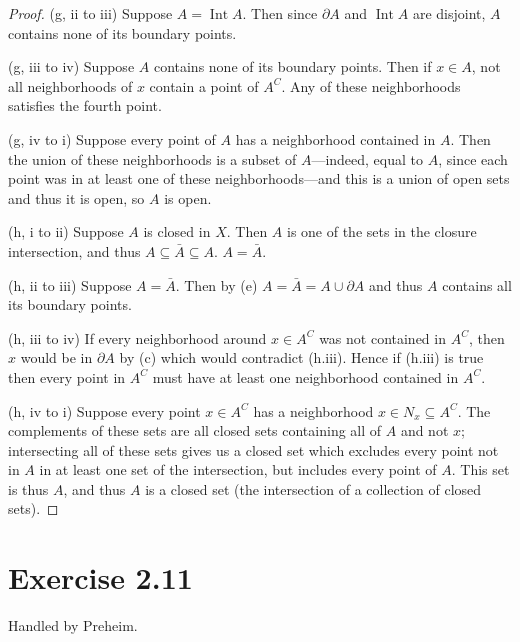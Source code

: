 \documentclass{article}
\newtheorem{theorem}[subsection]{Theorem}
\theoremstyle{definition}
\begin{document}
\begin{proof}
(g, ii to iii)
Suppose $A = \operatorname{Int} A$. Then since $\partial A$ and $\operatorname{Int} A$
are disjoint, $A$ contains none of its boundary points.

(g, iii to iv)
Suppose $A$ contains none of its boundary points. Then if $x \in A$, not all neighborhoods
of $x$ contain a point of $A^C$. Any of these neighborhoods satisfies the fourth point.

(g, iv to i)
Suppose every point of $A$ has a neighborhood contained in $A$. Then the union of these
neighborhoods is a subset of $A$---indeed, equal to $A$, since each point was in at least
one of these neighborhoods---and this is a union of open sets and thus it is open, so 
$A$ is open.

(h, i to ii)
Suppose $A$ is closed in $X$. Then $A$ is one of the sets in the closure intersection,
and thus $A \subseteq \bar{A} \subseteq A$. $A=\bar{A}$.

(h, ii to iii)
Suppose $A = \bar{A}$. Then by (e) $A = \bar{A} = A \cup \partial A$ and thus $A$
contains all its boundary points.

(h, iii to iv) 
If every neighborhood around $x \in A^C$ was not contained in $A^C$, then 
$x$ would be in $\partial A$ by (c) which would contradict (h.iii). Hence
if (h.iii) is true then every point in $A^C$ must have at least one neighborhood
contained in $A^C$.

(h, iv to i)
Suppose every point $x \in A^C$ has a neighborhood $x \in N_x \subseteq A^C$. The 
complements of these sets are all closed sets containing all of $A$ and not $x$; 
intersecting all of these sets gives us a closed set which excludes every point
not in $A$ in at least one set of the intersection, but includes every point of
$A$. This set is thus $A$, and thus $A$ is a closed set (the intersection of 
a collection of closed sets).
\end{proof}

\section{Exercise 2.11}
Handled by Preheim.
\end{document}
